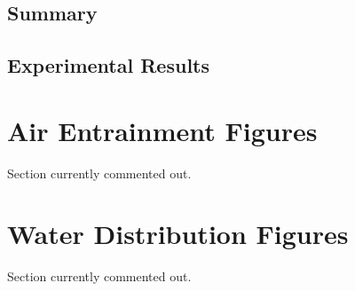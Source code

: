 \documentclass{article}
\begin{document}
\section{Summary}



\printbibliography

\clearpage

\begin{appendices}

\section{Experimental Results} \label{App:Results}
\renewcommand{\thesubsection}{\Alph{section}}

\appendix


\chapter{Air Entrainment Figures}
\label{app:Air_Entrainment_Figures}

Section currently commented out.

\chapter{Water Distribution Figures}
\label{app:Water_Distribution_Figures}

Section currently commented out.



\end{appendices}
\end{document}
